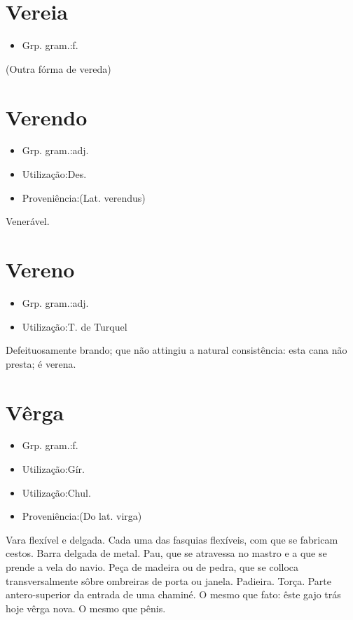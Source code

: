 \documentclass{article}
\begin{document}
\section{Vereia}
\begin{itemize}
\item {Grp. gram.:f.}
\end{itemize}
(Outra fórma de \textunderscore vereda\textunderscore )
\section{Verendo}
\begin{itemize}
\item {Grp. gram.:adj.}
\end{itemize}
\begin{itemize}
\item {Utilização:Des.}
\end{itemize}
\begin{itemize}
\item {Proveniência:(Lat. \textunderscore verendus\textunderscore )}
\end{itemize}
Venerável.
\section{Vereno}
\begin{itemize}
\item {Grp. gram.:adj.}
\end{itemize}
\begin{itemize}
\item {Utilização:T. de Turquel}
\end{itemize}
Defeituosamente brando; que não attingiu a natural consistência: \textunderscore esta cana não presta; é verena\textunderscore .
\section{Vêrga}
\begin{itemize}
\item {Grp. gram.:f.}
\end{itemize}
\begin{itemize}
\item {Utilização:Gír.}
\end{itemize}
\begin{itemize}
\item {Utilização:Chul.}
\end{itemize}
\begin{itemize}
\item {Proveniência:(Do lat. \textunderscore virga\textunderscore )}
\end{itemize}
Vara flexível e delgada.
Cada uma das fasquias flexíveis, com que se fabricam cestos.
Barra delgada de metal.
Pau, que se atravessa no mastro e a que se prende a vela do navio.
Peça de madeira ou de pedra, que se colloca transversalmente sôbre ombreiras de porta ou janela.
Padieira.
Torça.
Parte antero-superior da entrada de uma chaminé.
O mesmo que \textunderscore fato\textunderscore : \textunderscore êste gajo trás hoje vêrga nova\textunderscore .
O mesmo que \textunderscore pênis\textunderscore .
\end{document}
